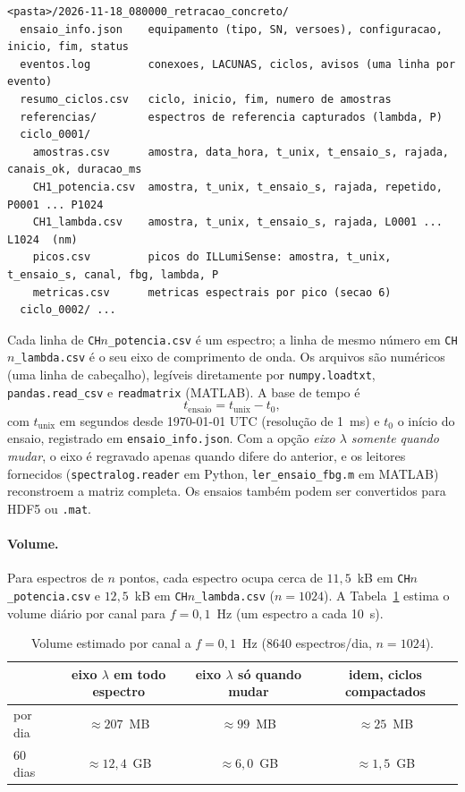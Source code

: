 \documentclass[11pt,a4paper]{article}
\begin{document}
\begin{lstlisting}[caption={Estrutura de um ensaio.},label={lst:tree},basicstyle=\ttfamily\footnotesize]
<pasta>/2026-11-18_080000_retracao_concreto/
  ensaio_info.json    equipamento (tipo, SN, versoes), configuracao, inicio, fim, status
  eventos.log         conexoes, LACUNAS, ciclos, avisos (uma linha por evento)
  resumo_ciclos.csv   ciclo, inicio, fim, numero de amostras
  referencias/        espectros de referencia capturados (lambda, P)
  ciclo_0001/
    amostras.csv      amostra, data_hora, t_unix, t_ensaio_s, rajada, canais_ok, duracao_ms
    CH1_potencia.csv  amostra, t_unix, t_ensaio_s, rajada, repetido, P0001 ... P1024
    CH1_lambda.csv    amostra, t_unix, t_ensaio_s, rajada, L0001 ... L1024  (nm)
    picos.csv         picos do ILLumiSense: amostra, t_unix, t_ensaio_s, canal, fbg, lambda, P
    metricas.csv      metricas espectrais por pico (secao 6)
  ciclo_0002/ ...
\end{lstlisting}

Cada linha de \texttt{CH$n$\_potencia.csv} é um espectro; a linha de mesmo número em
\texttt{CH$n$\_lambda.csv} é o seu eixo de comprimento de onda. Os arquivos são numéricos (uma linha de
cabeçalho), legíveis diretamente por \texttt{numpy.loadtxt}, \texttt{pandas.read\_csv} e
\texttt{readmatrix} (MATLAB). A base de tempo é
\begin{equation}
t_{\text{ensaio}} = t_{\text{unix}} - t_0,
\end{equation}
com $t_{\text{unix}}$ em segundos desde 1970-01-01 UTC (resolução de 1~ms) e $t_0$ o início do ensaio,
registrado em \texttt{ensaio\_info.json}. Com a opção \emph{eixo $\lambda$ somente quando mudar}, o
eixo é regravado apenas quando difere do anterior, e os leitores fornecidos
(\texttt{spectralog.reader} em Python, \texttt{ler\_ensaio\_fbg.m} em MATLAB) reconstroem a matriz
completa. Os ensaios também podem ser convertidos para HDF5 ou \texttt{.mat}.

\paragraph{Volume.} Para espectros de $n$ pontos, cada espectro ocupa cerca de $11{,}5$~kB em
\texttt{CH$n$\_potencia.csv} e $12{,}5$~kB em \texttt{CH$n$\_lambda.csv} ($n = 1024$). A
Tabela~\ref{tab:volume} estima o volume diário por canal para $f = 0{,}1$~Hz (um espectro a cada 10~s).

\begin{table}[htb]
\centering\small
\caption{Volume estimado por canal a $f=0{,}1$~Hz ($8640$ espectros/dia, $n=1024$).}
\label{tab:volume}
\begin{tabular}{@{}lccc@{}}
\toprule
 & eixo $\lambda$ em todo espectro & eixo $\lambda$ só quando mudar & idem, ciclos compactados \\
\midrule
por dia & $\approx 207$~MB & $\approx 99$~MB & $\approx 25$~MB \\
60 dias & $\approx 12{,}4$~GB & $\approx 6{,}0$~GB & $\approx 1{,}5$~GB \\
\bottomrule
\end{tabular}
\end{table}
\end{document}
